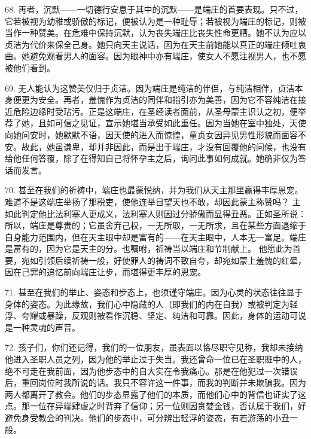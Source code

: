 68. 再者，沉默——一切德行安息于其中的沉默——是端庄的首要表现。只不过，它若被视为幼稚或骄傲的标记，便被认为是一种耻辱；若被视为端庄的标记，则被当作一种赞美。在危难中保持沉默，认为丧失端庄比丧失性命更糟。她不认为应以贞洁为代价来保全己身。她只向天主说话，因为在天主前她能以真正的端庄倾吐衷曲。她避免观看男人的面容。因为眼神中亦有端庄，使女人不愿注视男人，也不愿被他们看到。\par

69. 无人能认为这赞美仅归于贞洁。因为端庄是纯洁的伴侣，与纯洁相伴，贞洁本身便更为安全。再者，羞愧作为贞洁的同伴和指引亦为美善，因为它不容纯洁在接近危险边缘时受玷污。正是这端庄，在圣经读者面前，从圣母蒙主识认之初，便举荐了她，且如可信之见证，宣示她堪当承受如此重任。因为当她在室中独处，天使向她问安时，她默默不语，因天使的进入而惊惶，童贞女因异见男性形貌而面容不安。故此，她虽谦卑，却并非因此，而是出于端庄，才没有回覆他的问候，也没有给他任何答覆，除了在得知自己将怀孕主之后，询问此事如何成就。她确非仅为答话而发言。\par

70. 甚至在我们的祈祷中，端庄也最蒙悦纳，并为我们从天主那里赢得丰厚恩宠。难道不是这端庄举扬了那税吏，使他连举目望天也不敢，却因此蒙主称赞吗？ 主如此判定他比法利塞人更成义，法利塞人则因过分骄傲而显得丑恶。正如圣所说： 所以，端庄是尊贵的；它虽舍弃己权，一无所取，一无所求，且在某些方面退缩于自身能力范围内，但在天主眼中却是富有的——在天主眼中，人本无一富足。端庄是富有的，因为它是天主的分。也嘱咐，祈祷当以端庄和节制献上。 他愿此为首要，宛如引领后续祈祷一般，好使罪人的祷词不致自夸，却宛如蒙上羞愧的红晕，因在己罪的追忆前向端庄让步，而堪得更丰厚的恩宠。\par

71. 甚至在我们的举止、姿态和步态上，也须谨守端庄。因为心灵的状态往往显于身体的姿态。为此缘故，我们心中隐藏的人（即我们的内在自我）或被判定为轻浮、夸耀或暴躁，反观则被看作沉稳、坚定、纯洁和可靠。因此，身体的运动可说是一种灵魂的声音。\par

72. 孩子们，你们还记得，我们的一位朋友，虽表面以恪尽职守见称，我却未接纳他进入圣职人员之列，因为他的举止过于失当。我还曾命一位已在圣职班中的人，绝不可走在我前面，因为他步态中的自大实在令我痛心。那是在他犯过一次错误后，重回岗位时我所说的话。我只不容许这一件事，而我的判断并未欺骗我。因为两人都离开了教会。他们的步态显露了他们的本质，而他们心中的背信也证实了这点。那一位在异端肆虐之时背弃了信仰；另一位则因贪婪金钱，否认属于我们，好避免身受教会的判决。他们的步态中，可分辨出轻浮的姿态，有若游荡的小丑一般。\par


